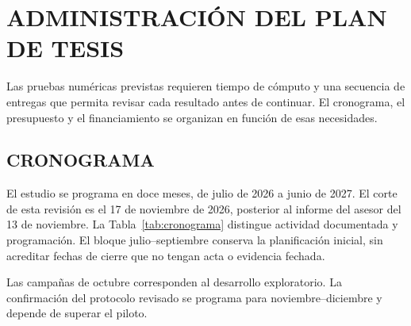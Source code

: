 \chapter{ADMINISTRACIÓN DEL PLAN DE TESIS}
\label{ch:administracion}
\thispagestyle{empty}

Las pruebas numéricas previstas requieren tiempo de cómputo y una secuencia de entregas que permita revisar cada resultado antes de continuar. El cronograma, el presupuesto y el financiamiento se organizan en función de esas necesidades.

\section{CRONOGRAMA}
\label{sec:cronograma}

El estudio se programa en doce meses, de julio de 2026 a junio de 2027. El corte de esta revisión es el 17 de noviembre de 2026, posterior al informe del asesor del 13 de noviembre. La Tabla~\ref{tab:cronograma} distingue actividad documentada y programación. El bloque julio--septiembre conserva la planificación inicial, sin acreditar fechas de cierre que no tengan acta o evidencia fechada.

Las campañas de octubre corresponden al desarrollo exploratorio. La confirmación del protocolo revisado se programa para noviembre--diciembre y depende de superar el piloto.

